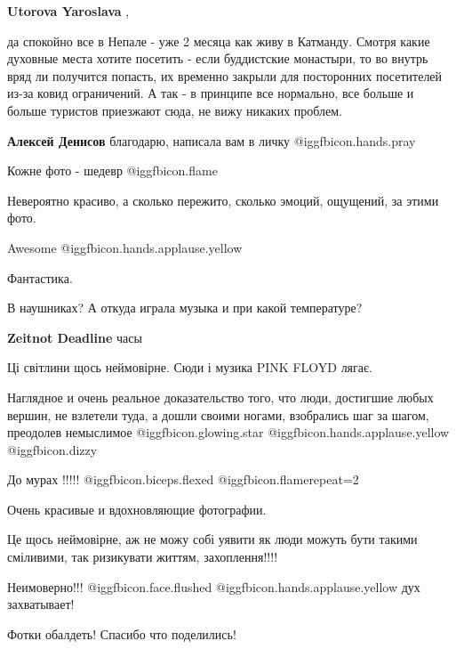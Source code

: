 \begin{itemize}
\begin{itemize}
\textbf{Utorova Yaroslava} , 

да спокойно все в Непале - уже 2 месяца как живу в Катманду. Смотря какие
духовные места хотите посетить - если буддистские монастыри, то во внутрь вряд
ли получится попасть, их временно закрыли для посторонних посетителей из-за
ковид ограничений. А так - в принципе все нормально, все больше и больше
туристов приезжают сюда, не вижу никаких проблем.

\textbf{Алексей Денисов} благодарю, написала вам в личку  @igg{fbicon.hands.pray} 
\end{itemize} %

Кожне фото - шедевр  @igg{fbicon.flame} 

Невероятно красиво, а сколько пережито, сколько эмоций, ощущений, за этими фото.

Awesome  @igg{fbicon.hands.applause.yellow} 

Фантастика.

В наушниках? А откуда играла музыка и при какой температуре?

\begin{itemize} %
\textbf{Zeitnot Deadline} часы
\end{itemize} %

Ці світлини щось неймовірне. Сюди і музика PINK FLOYD лягає.

Наглядное и очень реальное доказательство того, что люди, достигшие любых вершин, не взлетели туда, а дошли своими ногами, взобрались шаг за шагом, преодолев немыслимое  @igg{fbicon.glowing.star}  @igg{fbicon.hands.applause.yellow}  @igg{fbicon.dizzy} 

До мурах !!!!! @igg{fbicon.biceps.flexed}  @igg{fbicon.flame}{repeat=2} 

Очень красивые и вдохновляющие фотографии.

Це щось неймовірне, аж не можу собі уявити як люди можуть бути такими сміливими, так ризикувати життям, захоплення!!!!

Неимоверно!!! @igg{fbicon.face.flushed}  @igg{fbicon.hands.applause.yellow}  дух захватывает!

Фотки обалдеть! Спасибо что поделились!


\end{itemize}
